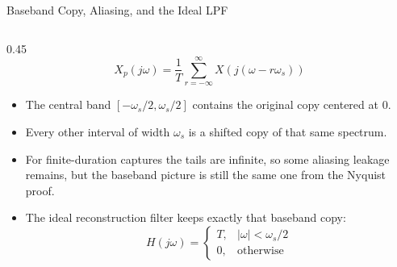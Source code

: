 \begin{frame}{Baseband Copy, Aliasing, and the Ideal LPF}
  \begin{columns}[T]
    \begin{column}{0.45\textwidth}
      \small
      \begin{equation*}
        X_p(j\omega)=\frac{1}{T}\sum_{r=-\infty}^{\infty} X(j(\omega-r\omega_s))
      \end{equation*}
      \begin{itemize}
          \setlength{\itemsep}{0.25em}
        \item The central band $[-\omega_s/2,\omega_s/2]$ contains the original copy centered at $0$.
        \item Every other interval of width $\omega_s$ is a shifted copy of that same spectrum.
        \item For finite-duration captures the tails are infinite, so some aliasing leakage remains, but the baseband picture is still the same one from the Nyquist proof.
        \item The ideal reconstruction filter keeps exactly that baseband copy:
          \begin{equation*}
            H(j\omega)=
            \begin{cases}
              T, & |\omega|<\omega_s/2 \\
              0, & \text{otherwise}
            \end{cases}
          \end{equation*}
      \end{itemize}
    \end{column}


\end{columns}
\end{frame}
